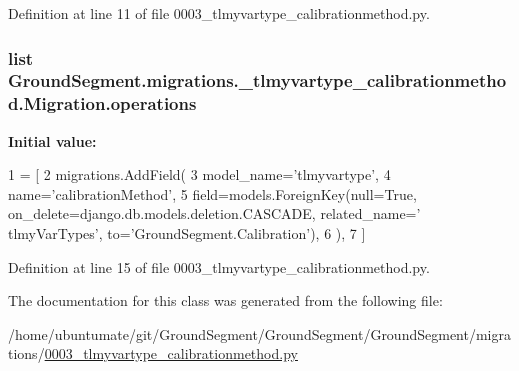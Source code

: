 Definition at line 11 of file 0003\+\_\+tlmyvartype\+\_\+calibrationmethod.\+py.

\hypertarget{class_ground_segment_1_1migrations_1_10003__tlmyvartype__calibrationmethod_1_1_migration_aad75bdb1b8ddb059354afe32362f044e}{}
\subsubsection[{operations}]{\setlength{\rightskip}{0pt plus 5cm}list Ground\+Segment.\+migrations.\+\_\+tlmyvartype\+\_\+calibrationmethod.\+Migration.\+operations\hspace{0.3cm}{\ttfamily [static]}}\label{class_ground_segment_1_1migrations_1_10003__tlmyvartype__calibrationmethod_1_1_migration_aad75bdb1b8ddb059354afe32362f044e}
{\bfseries Initial value\+:}
\begin{DoxyCode}
1 = [
2         migrations.AddField(
3             model\_name=\textcolor{stringliteral}{'tlmyvartype'},
4             name=\textcolor{stringliteral}{'calibrationMethod'},
5             field=models.ForeignKey(null=\textcolor{keyword}{True}, on\_delete=django.db.models.deletion.CASCADE, related\_name=\textcolor{stringliteral}{'
      tlmyVarTypes'}, to=\textcolor{stringliteral}{'GroundSegment.Calibration'}),
6         ),
7     ]
\end{DoxyCode}


Definition at line 15 of file 0003\+\_\+tlmyvartype\+\_\+calibrationmethod.\+py.



The documentation for this class was generated from the following file\+:\begin{DoxyCompactItemize}
\item 
/home/ubuntumate/git/\+Ground\+Segment/\+Ground\+Segment/\+Ground\+Segment/migrations/\hyperlink{0003__tlmyvartype__calibrationmethod_8py}{0003\+\_\+tlmyvartype\+\_\+calibrationmethod.\+py}\end{DoxyCompactItemize}
